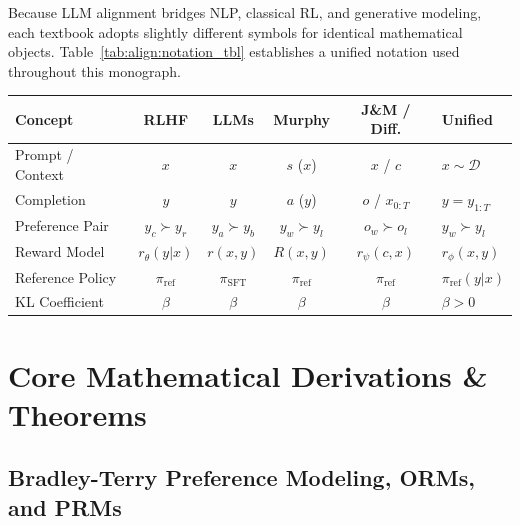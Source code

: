 \documentclass[../../../../master.tex]{subfiles}
\begin{document}
\begin{crossbook}
\label{tab:align:notation}
Because LLM alignment bridges NLP, classical RL, and generative modeling, each textbook adopts slightly different symbols for identical mathematical objects. Table~\ref{tab:align:notation_tbl} establishes a unified notation used throughout this monograph.
\medskip
\noindent
\begin{tabularx}{\linewidth}{@{}lccccX@{}}
\toprule
\textbf{Concept} & \textbf{RLHF} & \textbf{LLMs} & \textbf{Murphy} & \textbf{J\&M / Diff.} & \textbf{Unified} \\
\midrule
Prompt / Context & $x$ & $x$ & $s$ ($x$) & $x$ / $c$ & $x \sim \mathcal{D}$ \\
Completion & $y$ & $y$ & $a$ ($y$) & $o$ / $x_{0:T}$ & $y = y_{1:T}$ \\
Preference Pair & $y_c \succ y_r$ & $y_a \succ y_b$ & $y_w \succ y_l$ & $o_w \succ o_l$ & $y_w \succ y_l$ \\
Reward Model & $r_\theta(y|x)$ & $r(x,y)$ & $R(x,y)$ & $r_\psi(c,x)$ & $r_\phi(x,y)$ \\
Reference Policy & $\pi_{\mathrm{ref}}$ & $\pi_{\mathrm{SFT}}$ & $\pi_{\mathrm{ref}}$ & $\pi_{\mathrm{ref}}$ & $\pi_{\mathrm{ref}}(y|x)$ \\
KL Coefficient & $\beta$ & $\beta$ & $\beta$ & $\beta$ & $\beta > 0$ \\
\bottomrule
\end{tabularx}
\label{tab:align:notation_tbl}
\end{crossbook}

\section{Core Mathematical Derivations \& Theorems}
\label{sec:align:derivations}

\subsection{Bradley-Terry Preference Modeling, ORMs, and PRMs}
\end{document}
